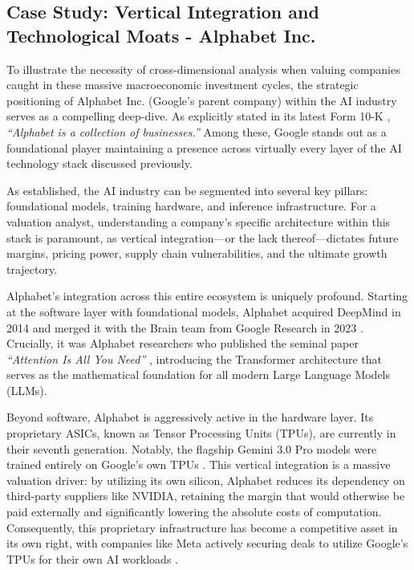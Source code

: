 \subsection{Case Study: Vertical Integration and Technological Moats - Alphabet Inc.} \label{subsec:case_study_alphabet}

To illustrate the necessity of cross-dimensional analysis when valuing companies caught in these massive macroeconomic investment cycles, the strategic positioning of Alphabet Inc. (Google's parent company) within the AI industry serves as a compelling deep-dive. As explicitly stated in its latest Form 10-K \parencite{alphabet202410k}, \textit{``Alphabet is a collection of businesses.''} Among these, Google stands out as a foundational player maintaining a presence across virtually every layer of the AI technology stack discussed previously.

As established, the AI industry can be segmented into several key pillars: foundational models, training hardware, and inference infrastructure. For a valuation analyst, understanding a company's specific architecture within this stack is paramount, as vertical integration—or the lack thereof—dictates future margins, pricing power, supply chain vulnerabilities, and the ultimate growth trajectory.

Alphabet's integration across this entire ecosystem is uniquely profound. Starting at the software layer with foundational models, Alphabet acquired DeepMind in 2014 and merged it with the Brain team from Google Research in 2023 \parencite{pichai2023merger}. Crucially, it was Alphabet researchers who published the seminal paper \textit{``Attention Is All You Need''} \parencite{vaswani2017transformer}, introducing the Transformer architecture that serves as the mathematical foundation for all modern Large Language Models (LLMs).

Beyond software, Alphabet is aggressively active in the hardware layer. Its proprietary ASICs, known as Tensor Processing Units (TPUs), are currently in their seventh generation. Notably, the flagship Gemini 3.0 Pro models were trained entirely on Google's own TPUs \parencite{gemini3pro_model_card}. This vertical integration is a massive valuation driver: by utilizing its own silicon, Alphabet reduces its dependency on third-party suppliers like NVIDIA, retaining the margin that would otherwise be paid externally and significantly lowering the absolute costs of computation. Consequently, this proprietary infrastructure has become a competitive asset in its own right, with companies like Meta actively securing deals to utilize Google's TPUs for their own AI workloads \parencite{the_information2026meta_tpu}.


